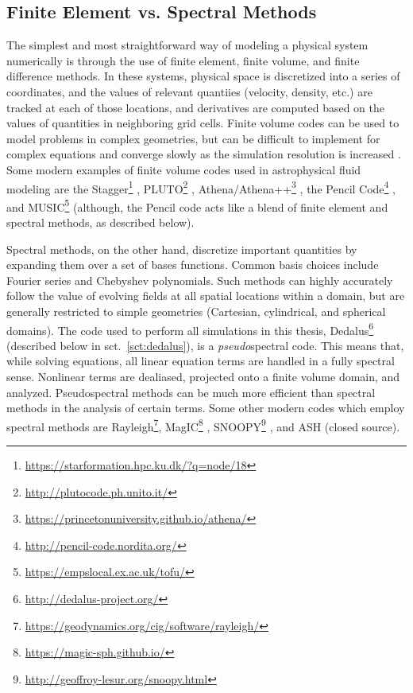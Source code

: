 \subsection{Finite Element vs. Spectral Methods}
The simplest and most straightforward way of modeling a physical system numerically is through the use of finite element, finite volume, and finite difference methods.
In these systems, physical space is discretized into a series of coordinates, and the values of relevant quantiies (velocity, density, etc.) are tracked at each of those locations, and derivatives are computed based on the values of quantities in neighboring grid cells.
Finite volume codes can be used to model problems in complex geometries, but can be difficult to implement for complex equations and converge slowly as the simulation resolution is increased \citep{burns&all2019}.
Some modern examples of finite volume codes used in astrophysical fluid modeling are the Stagger\footnote{\url{https://starformation.hpc.ku.dk/?q=node/18}} \citep{galsgaard2011}, PLUTO\footnote{\url{http://plutocode.ph.unito.it/}} \citep{mignone&all2012}, Athena/Athena++\footnote{\url{https://princetonuniversity.github.io/athena/}} \citep{stone&all2008, stone&all2019}, the Pencil Code\footnote{\url{http://pencil-code.nordita.org/}} \citep{brandenburg&dobler2010}, and MUSIC\footnote{\url{https://empslocal.ex.ac.uk/tofu/}} \citep{goffrey&all2017} (although, the Pencil code acts like a blend of finite element and spectral methods, as described below).

Spectral methods, on the other hand, discretize important quantities by expanding them over a set of bases functions.
Common basis choices include Fourier series and Chebyshev polynomials.
Such methods can highly accurately follow the value of evolving fields at all spatial locations within a domain, but are generally restricted to simple geometries (Cartesian, cylindrical, and spherical domains).
The code used to perform all simulations in this thesis, Dedalus\footnote{\url{http://dedalus-project.org/}} (described below in sct.~\ref{sct:dedalus}), is a \emph{pseudo}spectral code.
This means that, while solving equations, all linear equation terms are handled in a fully spectral sense.
Nonlinear terms are dealiased, projected onto a finite volume domain, and analyzed. 
Pseudospectral methods can be much more efficient than spectral methods in the analysis of certain terms.
Some other modern codes which employ spectral methods are Rayleigh\footnote{\url{https://geodynamics.org/cig/software/rayleigh/}}, MagIC\footnote{\url{https://magic-sph.github.io/}} \citep{wicht&all2017}, SNOOPY\footnote{\url{http://geoffroy-lesur.org/snoopy.html}} \citep{lesur2015}, and ASH (closed source).


